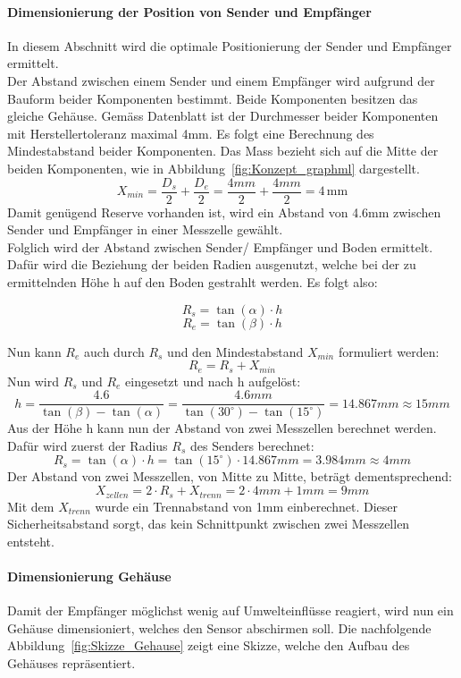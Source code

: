 \documentclass{article}
\begin{document}
\paragraph{Dimensionierung der Position von Sender und Empfänger}
In diesem Abschnitt wird die optimale Positionierung der Sender und Empfänger ermittelt.\\ 
Der Abstand zwischen einem Sender und einem Empfänger wird aufgrund der Bauform beider 
Komponenten bestimmt.
Beide Komponenten besitzen das gleiche Gehäuse. Gemäss Datenblatt ist der Durchmesser
beider Komponenten mit Herstellertoleranz maximal 4mm. Es folgt eine Berechnung des 
Mindestabstand beider Komponenten. Das Mass bezieht sich auf die Mitte der beiden 
Komponenten, wie in Abbildung~\ref{fig:Konzept_graphml} dargestellt.
\[ X_{min} = \frac{D_s}{2} + \frac{D_e}{2} = \frac{4mm}{2} + \frac{4mm}{2} = 4\,\text{mm} \]
Damit genügend Reserve vorhanden ist, wird ein Abstand von 4.6mm zwischen Sender und
Empfänger in einer Messzelle gewählt.\\

Folglich wird der Abstand zwischen Sender/ Empfänger und Boden ermittelt. Dafür 
wird die Beziehung der beiden Radien ausgenutzt, welche bei der zu ermittelnden Höhe
h auf den Boden gestrahlt werden. Es folgt also:

\[
R_s = \tan(\alpha) \cdot h 
\]
\[
R_e = \tan(\beta) \cdot h
\]

Nun kann \( R_e \) auch durch \( R_s \) und den Mindestabstand \( X_{min} \) formuliert werden:
\[
    R_e = R_s + X_{min}
\]
Nun wird \( R_s \) und \( R_e \) eingesetzt und nach h aufgelöst:
\[
h = \frac{4.6}{\tan(\beta) - \tan(\alpha)} = \frac{4.6mm}{\tan(30^\circ) - \tan(15^\circ)} = 14.867{mm} \approx 15{mm}
\]
Aus der Höhe h kann nun der Abstand von zwei Messzellen berechnet werden. Dafür 
wird zuerst der Radius \( R_s \) des Senders berechnet:
\[
R_s = \tan(\alpha) \cdot h = \tan(15^\circ) \cdot 14.867{mm} = 3.984{mm} \approx 4{mm}
\]
Der Abstand von zwei Messzellen, von Mitte zu Mitte, beträgt dementsprechend:
\[
X_{zellen} = 2 \cdot R_s + X_{trenn} = 2 \cdot 4{mm} + 1{mm} = 9{mm}
\]
Mit dem \( X_{trenn} \) wurde ein Trennabstand von 1mm einberechnet. Dieser 
Sicherheitsabstand sorgt, das kein Schnittpunkt zwischen zwei Messzellen entsteht.

\paragraph{Dimensionierung Gehäuse}
Damit der Empfänger möglichst wenig auf Umwelteinflüsse reagiert, wird nun ein 
Gehäuse dimensioniert, welches den Sensor abschirmen soll. Die nachfolgende 
Abbildung~\ref{fig:Skizze_Gehause} zeigt eine Skizze, welche den Aufbau des Gehäuses repräsentiert.
\end{document}
